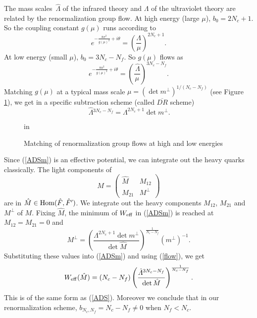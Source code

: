 \documentclass[lecture]{qft-l}
\newcommand{\tht}{\theta}
\newcommand{\Lam}{\varLambda}
\newcommand{\bef}{\begin{figure}[h]
		\vspace{3ex}}
\newcommand{\enf}{\end{figure}}
\newcommand{\inv}[1]{\frac{1}{#1}}
\newcommand{\e}[1]{e^{{#1}}}
\newcommand{\ii}{i}
\newcommand{\eff}{_{{\rm eff}}}
\newcommand{\four}[4]{\left(	\begin{array}{cc}
				{#1}	&	{#2}	\\
				{#3}	&	{#4}
				\end{array}   \right)}
\newcommand{\Hom}{{\rm Hom}}
\newcommand{\FTh}{\hat{F}'}
\newcommand{\Lamh}{\,\hat{\!\Lam}{}}
\numberwithin{figure}{chapter}
\begin{document}
The mass scales $\Lamh$ of the infrared theory and $\Lam$ of the ultraviolet
theory are related by the renormalization group flow.
At high energy (large $\mu$), $b_0=2N_c+1$.
So the coupling constant $g(\mu)$ runs according to
	\begin{equation}
\e{-\frac{8\pi^2}{g(\mu)^2}+\ii\tht}=\left(\frac{\Lam}{\mu}\right)^{2N_c+1}.
	\end{equation}
At low energy (small $\mu$), $b_0=3N_c-N_f$. 
So $g(\mu)$ flows as
	\begin{equation}
\e{-\frac{8\pi^2}{g(\mu)^2}+\ii\tht}=
\left(\frac{\Lamh}{\mu}\right)^{3N_c-N_f}.
	\end{equation}
Matching $g(\mu)$ at a typical mass scale $\mu=(\det m^\perp)^{1/(N_c-N_f)}$
(see Figure \ref{FLOW}), we get in a specific subtraction scheme (called
$\overline{DR}$ scheme)
	\begin{equation}\label{flow}
\Lamh^{3N_c-N_f}=\Lam^{2N_c+1}\det m^\perp.
	\end{equation}

	\bef
{} in
\centerline{}
\caption{\protect\label{FLOW}Matching of renormalization group flows at high 
and low energies}
	\enf

Since (\ref{ADSm}) is an effective potential, we can integrate out the 
heavy quarks classically.
The light components of
	\begin{equation}\label{Mblock}
M=\four{\hat{M}}{M_{12}}{M_{21}}{M^\perp}
	\end{equation}
are in $\hat{M}\in\Hom(\hat{F},\FTh)$.
We integrate out the heavy components $M_{12}$, $M_{21}$ and $M^\perp$ of $M$.
Fixing $\hat{M}$, the minimum of $W\eff$ in (\ref{ADSm}) is reached at
$M_{12}=M_{21}=0$ and
	\begin{equation}
M^\perp=\left(\frac{\Lam^{2N_c+1}\det m^\perp}{\det\hat{M}}\right)
^{\inv{N_c-N_f}}(m^\perp)^{-1}.
	\end{equation}
Substituting these values into (\ref{ADSm}) and using (\ref{flow}), we get
	\begin{equation}
W\eff(\hat{M})=(N_c-N_f)
\left(\frac{\Lamh^{3N_c-N_f}}{\det\hat{M}}\right)^{\inv{N_c-N_f}}.
	\end{equation}
This is of the same form as (\ref{ADS}).
Moreover we conclude that in our renormalization scheme,
$b_{N_c,N_f}=N_c-N_f\ne0$ when $N_f<N_c$.
\end{document}
